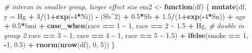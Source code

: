\documentclass[12pt, twoside]{amherstthesis}
\newenvironment{Shaded}{\begin{snugshade}}{\end{snugshade}}
\newcommand{\AttributeTok}[1]{\textcolor[rgb]{0.13,0.29,0.53}{#1}}
\newcommand{\CommentTok}[1]{\textcolor[rgb]{0.56,0.35,0.01}{\textit{#1}}}
\newcommand{\ControlFlowTok}[1]{\textcolor[rgb]{0.13,0.29,0.53}{\textbf{#1}}}
\newcommand{\DecValTok}[1]{\textcolor[rgb]{0.00,0.00,0.81}{#1}}
\newcommand{\FloatTok}[1]{\textcolor[rgb]{0.00,0.00,0.81}{#1}}
\newcommand{\FunctionTok}[1]{\textcolor[rgb]{0.13,0.29,0.53}{\textbf{#1}}}
\newcommand{\NormalTok}[1]{#1}
\newcommand{\OtherTok}[1]{\textcolor[rgb]{0.56,0.35,0.01}{#1}}
\newcommand{\SpecialCharTok}[1]{\textcolor[rgb]{0.81,0.36,0.00}{\textbf{#1}}}
\begin{document}
\begin{Shaded}
\begin{Highlighting}[]
\CommentTok{\# interxn in smaller group, larger effect size}
\NormalTok{em2 }\OtherTok{\textless{}{-}} \ControlFlowTok{function}\NormalTok{(df) \{}
  \FunctionTok{mutate}\NormalTok{(df, }\AttributeTok{y =} 
\NormalTok{           Hg }\SpecialCharTok{+} \DecValTok{3}\SpecialCharTok{/}\NormalTok{(}\DecValTok{1}\SpecialCharTok{+}\FunctionTok{exp}\NormalTok{(}\SpecialCharTok{{-}}\DecValTok{4}\SpecialCharTok{*}\NormalTok{Ni)) }\SpecialCharTok{{-}}\NormalTok{ (Sb}\SpecialCharTok{\^{}}\DecValTok{2}\NormalTok{) }\SpecialCharTok{+} \FloatTok{0.5}\SpecialCharTok{*}\NormalTok{Sb }\SpecialCharTok{+} \FloatTok{1.5}\SpecialCharTok{/}\NormalTok{(}\DecValTok{1}\SpecialCharTok{+}\FunctionTok{exp}\NormalTok{(}\SpecialCharTok{{-}}\DecValTok{4}\SpecialCharTok{*}\NormalTok{Sn)) }\SpecialCharTok{+} 
\NormalTok{           age }\SpecialCharTok{+} \FloatTok{0.5}\SpecialCharTok{*}\NormalTok{bmi }\SpecialCharTok{+} 
           \FunctionTok{case\_when}\NormalTok{(race }\SpecialCharTok{==} \DecValTok{1} \SpecialCharTok{\textasciitilde{}} \DecValTok{1}\NormalTok{, }
\NormalTok{                     race }\SpecialCharTok{==} \DecValTok{2} \SpecialCharTok{\textasciitilde{}} \FloatTok{1.5} \SpecialCharTok{+}\NormalTok{ Hg, }\CommentTok{\# double in group 2}
\NormalTok{                     race }\SpecialCharTok{==} \DecValTok{3} \SpecialCharTok{\textasciitilde{}} \DecValTok{1}\NormalTok{, }
\NormalTok{                     race }\SpecialCharTok{==} \DecValTok{4} \SpecialCharTok{\textasciitilde{}} \DecValTok{1}\NormalTok{, }
\NormalTok{                     race }\SpecialCharTok{==} \DecValTok{5} \SpecialCharTok{\textasciitilde{}} \FloatTok{1.5}\NormalTok{) }\SpecialCharTok{+}
           \FunctionTok{ifelse}\NormalTok{(smoke }\SpecialCharTok{==} \DecValTok{1}\NormalTok{, }\SpecialCharTok{{-}}\DecValTok{1}\NormalTok{, }\FloatTok{0.5}\NormalTok{) }\SpecialCharTok{+}
           \FunctionTok{rnorm}\NormalTok{(}\FunctionTok{nrow}\NormalTok{(df), }\DecValTok{0}\NormalTok{, }\DecValTok{5}\NormalTok{))}
\NormalTok{\}}


\end{Highlighting}
\end{Shaded}
\end{document}
